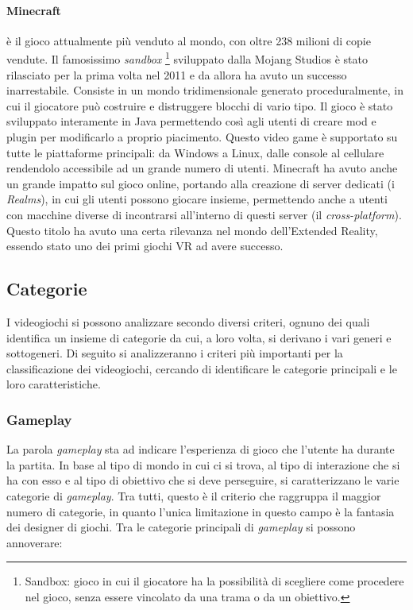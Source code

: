         \paragraph{Minecraft} è il gioco attualmente più venduto al mondo, con oltre 238 milioni di copie vendute. Il famosissimo \textit{sandbox}
            \footnote{Sandbox: gioco in cui il giocatore ha la possibilità di scegliere come procedere nel gioco, senza essere vincolato da una trama o da un obiettivo.}
            sviluppato dalla Mojang Studios è stato
            rilasciato per la prima volta nel 2011 e da allora ha avuto un successo inarrestabile. Consiste in un mondo tridimensionale generato proceduralmente, in cui il giocatore
            può costruire e distruggere blocchi di vario tipo. Il gioco è stato sviluppato interamente in Java permettendo così agli utenti di creare mod e plugin per modificarlo
            a proprio piacimento. Questo video game è supportato su tutte le piattaforme principali: da Windows a Linux, dalle console al cellulare rendendolo accessibile ad un grande
            numero di utenti. Minecraft ha avuto anche un grande impatto sul gioco online, portando alla creazione di server dedicati (i \textit{Realms}), in cui gli utenti possono 
            giocare insieme, permettendo anche a utenti con macchine diverse di incontrarsi all'interno di questi server (il \textit{cross-platform}). Questo titolo ha avuto una 
            certa rilevanza nel mondo dell'Extended Reality, essendo stato uno dei primi giochi VR ad avere successo.

    \subsection{Categorie}\label{subsec:VideogiochiCategorie}
        I videogiochi si possono analizzare secondo diversi criteri, ognuno dei quali identifica un insieme di categorie da cui, a loro volta, si derivano i vari generi e sottogeneri.
        Di seguito si analizzeranno i criteri più importanti per la classificazione dei videogiochi, cercando di identificare le categorie principali e le loro caratteristiche.

        \subsubsection{Gameplay}
            La parola \textit{gameplay} sta ad indicare l'esperienza di gioco che l'utente ha durante la partita. In base al tipo di mondo in cui ci si trova, al tipo di interazione
            che si ha con esso e al tipo di obiettivo che si deve perseguire, si caratterizzano le varie categorie di \textit{gameplay}. Tra tutti, questo è il criterio che raggruppa 
            il maggior numero di categorie, in quanto l'unica limitazione in questo campo è la fantasia dei designer di giochi. Tra le categorie principali di \textit{gameplay} si possono
            annoverare:
            
